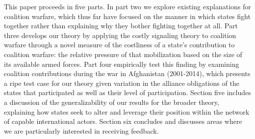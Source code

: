 \documentclass[12pt,letterpaper]{article}
\begin{document}
	This paper proceeds in five parts. In part two we explore existing explanations for coalition warfare, which thus far have focused on the manner in which states fight together rather than explaining why they bother fighting together at all. Part three develops our theory by applying the costly signaling theory to coalition warfare through a novel measure of the costliness of a state's contribution to coalition warfare: the relative pressure of that mobilization based on the size of its available armed forces. Part four empirically test this finding by examining coalition contributions during the war in Afghanistan (2001-2014), which presents a ripe test case for our theory given variation in the alliance obligations of the states that participated as well as their level of participation. Section five includes a discussion of the generalizability of our results for the broader theory, explaining how states seek to alter and leverage their position within the network of capable international actors. Section six concludes and discusses areas where we are particularly interested in receiving feedback.
\end{document}

